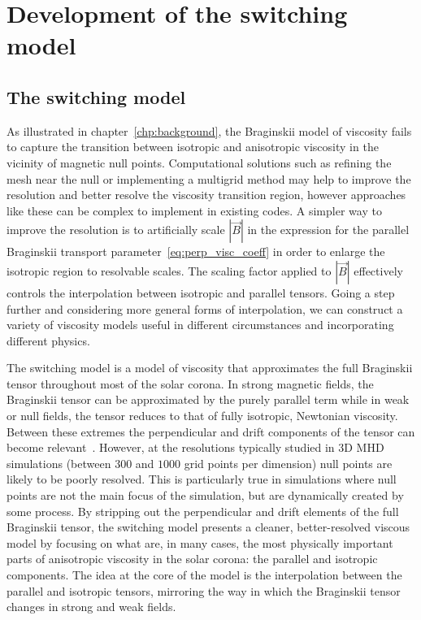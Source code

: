 \chapter{Development of the switching model}
\label{chp:switching_model}

\graphicspath{{images/development_of_switching_model/}}

\section{The switching model}

As illustrated in chapter~\ref{chp:background}, the Braginskii model of viscosity fails to capture the transition between isotropic and anisotropic viscosity in the vicinity of magnetic null points. Computational solutions such as refining the mesh near the null or implementing a multigrid method may help to improve the resolution and better resolve the viscosity transition region, however approaches like these can be complex to implement in existing codes. A simpler way to improve the resolution is to artificially scale $|\vec{B}|$ in the expression for the parallel Braginskii transport parameter~\ref{eq:perp_visc_coeff} in order to enlarge the isotropic region to resolvable scales. The scaling factor applied to $|\vec{B}|$ effectively controls the interpolation between isotropic and parallel tensors. Going a step further and considering more general forms of interpolation, we can construct a variety of viscosity models useful in different circumstances and incorporating different physics.

The switching model is a model of viscosity that approximates the full Braginskii tensor throughout most of the solar corona. In strong magnetic fields, the Braginskii tensor can be approximated by the purely parallel term while in weak or null fields, the tensor reduces to that of fully isotropic, Newtonian viscosity. Between these extremes the perpendicular and drift components of the tensor can become relevant~\cite{erdelyiResonantAbsorptionAlfven1995a}. However, at the resolutions typically studied in 3D MHD simulations (between $300$ and $1000$ grid points per dimension) null points are likely to be poorly resolved. This is particularly true in simulations where null points are not the main focus of the simulation, but are dynamically created by some process. By stripping out the perpendicular and drift elements of the full Braginskii tensor, the switching model presents a cleaner, better-resolved viscous model by focusing on what are, in many cases, the most physically important parts of anisotropic viscosity in the solar corona: the parallel and isotropic components. The idea at the core of the model is the interpolation between the parallel and isotropic tensors, mirroring the way in which the Braginskii tensor changes in strong and weak fields.

